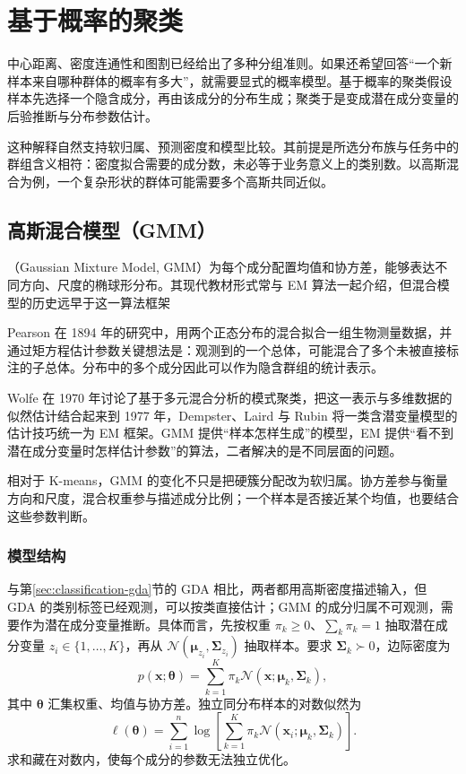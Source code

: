 \section{基于概率的聚类}
\label{sec:clustering-probabilistic}

中心距离、密度连通性和图割已经给出了多种分组准则。如果还希望回答“一个新样本来自哪种群体的概率有多大”，就需要显式的概率模型。基于概率的聚类假设样本先选择一个隐含成分，再由该成分的分布生成；聚类于是变成潜在成分变量的后验推断与分布参数估计。

这种解释自然支持软归属、预测密度和模型比较。其前提是所选分布族与任务中的群组含义相符：密度拟合需要的成分数，未必等于业务意义上的类别数。以高斯混合为例，一个复杂形状的群体可能需要多个高斯共同近似。

\subsection{高斯混合模型（GMM）}
\label{sec:clustering-gmm}

（Gaussian Mixture Model, GMM）为每个成分配置均值和协方差，能够表达不同方向、尺度的椭球形分布。其现代教材形式常与 EM 算法一起介绍，但混合模型的历史远早于这一算法框架

Pearson 在 1894 年的研究中，用两个正态分布的混合拟合一组生物测量数据，并通过矩方程估计参数关键想法是：观测到的一个总体，可能混合了多个未被直接标注的子总体。分布中的多个成分因此可以作为隐含群组的统计表示。

Wolfe 在 1970 年讨论了基于多元混合分析的模式聚类，把这一表示与多维数据的似然估计结合起来到 1977 年，Dempster、Laird 与 Rubin 将一类含潜变量模型的估计技巧统一为 EM 框架。GMM 提供“样本怎样生成”的模型，EM 提供“看不到潜在成分变量时怎样估计参数”的算法，二者解决的是不同层面的问题。

相对于 K-means，GMM 的变化不只是把硬簇分配改为软归属。协方差参与衡量方向和尺度，混合权重参与描述成分比例；一个样本是否接近某个均值，也要结合这些参数判断。

\subsubsection{模型结构}

与第\ref{sec:classification-gda}节的 GDA 相比，两者都用高斯密度描述输入，但 GDA 的类别标签已经观测，可以按类直接估计；GMM 的成分归属不可观测，需要作为潜在成分变量推断。具体而言，先按权重 $\pi_k\geq0$、$\sum_k\pi_k=1$ 抽取潜在成分变量 $z_i\in\{1,\ldots,K\}$，再从 $\mathcal{N}(\bm{\mu}_{z_i},\bm{\Sigma}_{z_i})$ 抽取样本。要求 $\bm{\Sigma}_k\succ0$，边际密度为
\begin{equation}
 p(\bm{x};\bm{\theta})
 =\sum_{k=1}^K\pi_k
   \mathcal{N}(\bm{x};\bm{\mu}_k,\bm{\Sigma}_k),
 \label{eq:clustering-gmm}
\end{equation}
其中 $\bm{\theta}$ 汇集权重、均值与协方差。独立同分布样本的对数似然为
\[
 \ell(\bm{\theta})
 =\sum_{i=1}^n\log\left[
 \sum_{k=1}^K\pi_k
 \mathcal{N}(\bm{x}_i;\bm{\mu}_k,\bm{\Sigma}_k)\right].
\]
求和藏在对数内，使每个成分的参数无法独立优化。

